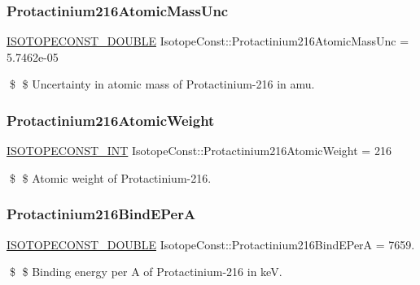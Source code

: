 \subsubsection{\texorpdfstring{Protactinium216\+Atomic\+Mass\+Unc}{Protactinium216AtomicMassUnc}}
{\footnotesize\ttfamily \mbox{\hyperlink{group___isotope_const-_macros_ga8f45a7272ce02c0b4c65c44636ed719a}{I\+S\+O\+T\+O\+P\+E\+C\+O\+N\+S\+T\+\_\+\+D\+O\+U\+B\+LE}} Isotope\+Const\+::\+Protactinium216\+Atomic\+Mass\+Unc = 5.\+7462e-\/05}

\$ \$ Uncertainty in atomic mass of Protactinium-\/216 in amu. \mbox{\label{group___isotope_const-_protactinium-_pa216_ga2c543462db5c22e8284d3194fa18f6b7}} 
\subsubsection{\texorpdfstring{Protactinium216\+Atomic\+Weight}{Protactinium216AtomicWeight}}
{\footnotesize\ttfamily \mbox{\hyperlink{group___isotope_const-_macros_ga5f18360b3e99483a35c32d789e62621c}{I\+S\+O\+T\+O\+P\+E\+C\+O\+N\+S\+T\+\_\+\+I\+NT}} Isotope\+Const\+::\+Protactinium216\+Atomic\+Weight = 216}

\$ \$ Atomic weight of Protactinium-\/216. \mbox{\label{group___isotope_const-_protactinium-_pa216_ga6ada953bc779ceae2d9d6e0ddbeb2c12}} 
\subsubsection{\texorpdfstring{Protactinium216\+Bind\+E\+PerA}{Protactinium216BindEPerA}}
{\footnotesize\ttfamily \mbox{\hyperlink{group___isotope_const-_macros_ga8f45a7272ce02c0b4c65c44636ed719a}{I\+S\+O\+T\+O\+P\+E\+C\+O\+N\+S\+T\+\_\+\+D\+O\+U\+B\+LE}} Isotope\+Const\+::\+Protactinium216\+Bind\+E\+PerA = 7659.}

\$ \$ Binding energy per A of Protactinium-\/216 in keV. \mbox{\label{group___isotope_const-_protactinium-_pa216_gae640484acbeee9d14aeebe3d0ab5bbdc}} 
